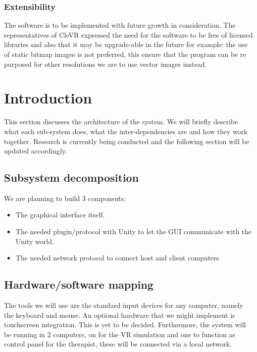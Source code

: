 \documentclass[11pt]{article}
\begin{document}
        \subsubsection{Extensibility}
        The software is to be implemented with future growth in consideration. The representatives of CleVR expressed the need for the software to be free of licensed libraries and also that it may be upgrade-able in the future for example: the use of static bitmap images is not preferred, this ensure that the program can be re purposed for other resolutions we are to use vector images instead. 
        


\section{Introduction}
This section discusses the architecture of the system. We will briefly describe what each sub-system does, what the inter-dependencies are and how they work together. Research is currently being conducted and the following section will be updated accordingly.

    \subsection{Subsystem decomposition}
    We are planning to build 3 components:
	\begin{itemize}
  		\item The graphical interface itself.
  		\item The needed plugin/protocol with Unity to let the GUI communicate with the Unity world.
        \item The needed network protocol to connect host and client computers
	\end{itemize}   
    
    \subsection{Hardware/software mapping }
    The tools we will use are the standard input devices for any computer, namely the keyboard and mouse. An optional hardware that we might implement is touchscreen integration. This is yet to be decided.
    Furthermore, the system will be running in 2 computers, on for the VR simulation and one to function as control panel for the therapist, these will be connected via a local network.
    
\end{document}
